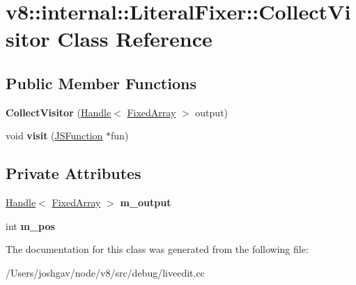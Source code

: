 \hypertarget{classv8_1_1internal_1_1_literal_fixer_1_1_collect_visitor}{}\section{v8\+:\+:internal\+:\+:Literal\+Fixer\+:\+:Collect\+Visitor Class Reference}
\label{classv8_1_1internal_1_1_literal_fixer_1_1_collect_visitor}
\subsection*{Public Member Functions}
\begin{DoxyCompactItemize}
\item 
{\bfseries Collect\+Visitor} (\hyperlink{classv8_1_1internal_1_1_handle}{Handle}$<$ \hyperlink{classv8_1_1internal_1_1_fixed_array}{Fixed\+Array} $>$ output)\hypertarget{classv8_1_1internal_1_1_literal_fixer_1_1_collect_visitor_ae0b90cbe53d1cf215204e7a6493d51a3}{}\label{classv8_1_1internal_1_1_literal_fixer_1_1_collect_visitor_ae0b90cbe53d1cf215204e7a6493d51a3}

\item 
void {\bfseries visit} (\hyperlink{classv8_1_1internal_1_1_j_s_function}{J\+S\+Function} $\ast$fun)\hypertarget{classv8_1_1internal_1_1_literal_fixer_1_1_collect_visitor_aa6d66e9a11bb3ff7d103fe1ba2130022}{}\label{classv8_1_1internal_1_1_literal_fixer_1_1_collect_visitor_aa6d66e9a11bb3ff7d103fe1ba2130022}

\end{DoxyCompactItemize}
\subsection*{Private Attributes}
\begin{DoxyCompactItemize}
\item 
\hyperlink{classv8_1_1internal_1_1_handle}{Handle}$<$ \hyperlink{classv8_1_1internal_1_1_fixed_array}{Fixed\+Array} $>$ {\bfseries m\+\_\+output}\hypertarget{classv8_1_1internal_1_1_literal_fixer_1_1_collect_visitor_a8d4c9ae2b2af58c6afb441b9e06bf6b2}{}\label{classv8_1_1internal_1_1_literal_fixer_1_1_collect_visitor_a8d4c9ae2b2af58c6afb441b9e06bf6b2}

\item 
int {\bfseries m\+\_\+pos}\hypertarget{classv8_1_1internal_1_1_literal_fixer_1_1_collect_visitor_a3d4b18875aca3d0a32fe068582088326}{}\label{classv8_1_1internal_1_1_literal_fixer_1_1_collect_visitor_a3d4b18875aca3d0a32fe068582088326}

\end{DoxyCompactItemize}


The documentation for this class was generated from the following file\+:\begin{DoxyCompactItemize}
\item 
/\+Users/joshgav/node/v8/src/debug/liveedit.\+cc\end{DoxyCompactItemize}
